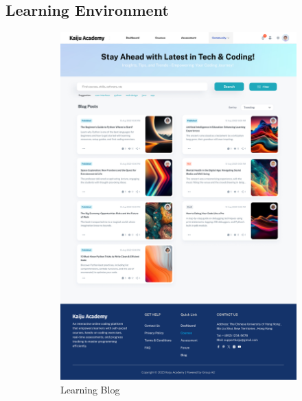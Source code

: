 \documentclass[a4paper, 11pt]{scrreprt}
\begin{document}
\subsection{Learning Environment}
\begin{figure}[ht]
    \centering
    \begin{subfigure}[b]{0.32\textwidth}
        \centering
        \includegraphics[width=\textwidth]{UI/Blog.jpg}
        \caption{Learning Blog}
    \end{subfigure}
    \hfill
    \begin{subfigure}[b]{0.32\textwidth}
        \centering

\end{subfigure}
\end{figure}
\end{document}
